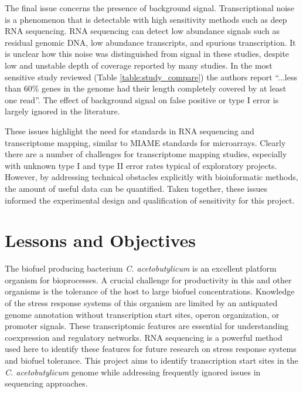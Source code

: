 The final issue concerns the presence of background signal. Transcriptional noise is a phenomenon that is detectable with high sensitivity methods such as deep RNA sequencing.\cite{164,165} RNA sequencing can detect low abundance signals such as residual genomic DNA,\cite{176} low abundance transcripts,\cite{109,110,58,177} and spurious transcription.\cite{164,165} It is unclear how this noise was distinguished from signal in these studies, despite low and unstable depth of coverage reported by many studies.\cite{113,114,115,172} In the most sensitive study reviewed (Table \ref{table:study_compare}) the authors report ``...less than 60\% genes in the genome had their length completely covered by at least one read''.\cite{115} The effect of background signal on false positive or type I error is largely ignored in the literature.

These issues highlight the need for standards in RNA sequencing and transcriptome mapping, similar to MIAME standards for microarrays.\cite{178} Clearly there are a number of challenges for transcriptome mapping studies, especially with unknown type I and type II error rates typical of exploratory projects.\cite{108,109,110,111,112,174,175,176,177,179} However, by addressing technical obstacles explicitly with bioinformatic methods, the amount of useful data can be quantified. Taken together, these issues informed the experimental design and qualification of sensitivity for this project.

\section{Lessons and Objectives}
The biofuel producing bacterium \textit{C. acetobutylicum} is an excellent platform organism for bioprocesses. A crucial challenge for productivity in this and other organisms is the tolerance of the host to large biofuel concentrations. Knowledge of the stress response systems of this organism are limited by an antiquated genome annotation\cite{91} without transcription start sites, operon organization, or promoter signals. These transcriptomic features are essential for understanding coexpression and regulatory networks. RNA sequencing is a powerful method used here to identify these features for future research on stress response systems and biofuel tolerance. This project aims to identify transcription start sites in the \textit{C. acetobutylicum} genome while addressing frequently ignored issues in sequencing approaches. 


